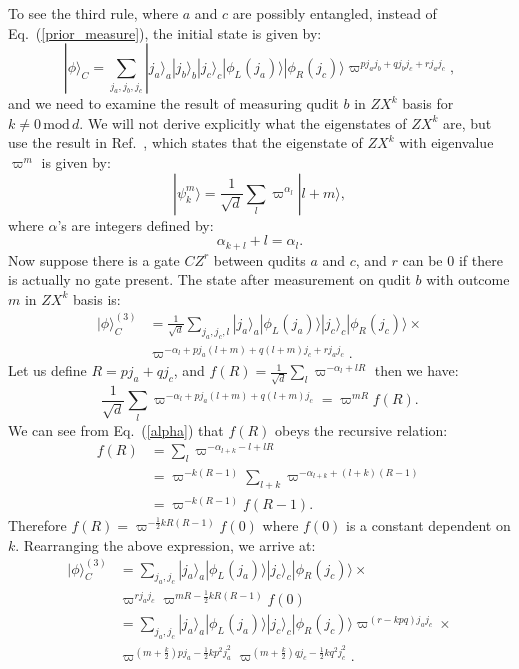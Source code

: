 \documentclass[aps,amsfonts,pra,twocolumn,showpacs]{revtex4-1}
\newcommand{\be}{\begin{equation}}
\newcommand{\ee}{\end{equation}}
\begin{document}
	To see the third rule, where $a$ and $c$ are possibly entangled, instead of Eq.~(\ref{prior_measure}), the initial state is given by:
		\be
		|\phi\rangle_C = \sum_{j_a, j_b, j_c} |j_a\rangle_a |j_b\rangle_b |j_c\rangle_c |\phi_L(j_a)\rangle |\phi_R(j_c)\rangle \varpi^{pj_aj_b+qj_bj_c+rj_aj_c},
		\ee
	and we need to  examine the result of measuring qudit $b$ in $ZX^k$ basis for $k\neq0 \, \mathrm{mod} \, d$. We will not derive explicitly what the eigenstates of $ZX^k$ are, but use the result in Ref.~\cite{Hall2006}, which states that the eigenstate of $ZX^k$ with eigenvalue $\varpi^m$ is given by:
		\be
		|\psi_k^m\rangle = \frac{1}{\sqrt{d}} \sum_l \varpi^{\alpha_l} |l+m\rangle,
		\ee
where $\alpha$'s are integers defined by:
		\be
		\alpha_{k+l}+l=\alpha_l.
		\label{alpha}
		\ee
	Now suppose there is a gate $CZ^r$ between qudits $a$ and $c$, and $r$ can be 0 if there is actually no gate present. The state after measurement on qudit $b$ with outcome $m$ in $ZX^k$ basis is:
		\begin{align}
		|\phi\rangle_C^{(3)} & = \frac{1}{\sqrt{d}} \sum_{j_a, j_c, l} |j_a\rangle_a| \phi_L(j_a)\rangle |j_c\rangle_c|\phi_R(j_c)\rangle \times \nonumber \\
			& \varpi^{-\alpha_l+pj_a(l+m)+q(l+m)j_c+rj_aj_c}.
		\end{align}
	Let us define $R=pj_a+qj_c$, and $f(R)=\frac{1}{\sqrt{d}} \sum_{l} \varpi^{-\alpha_l+lR}$ then we have:
		\be
		\frac{1}{\sqrt{d}} \sum_l \varpi^{-\alpha_l+pj_a(l+m)+q(l+m)j_c} = \varpi^{mR} f(R).
		\ee
	We can see from Eq.~(\ref{alpha}) that $f(R)$ obeys the recursive relation:
		\begin{align}
		f(R) & = \sum_{l} \varpi^{-\alpha_{l+k}-l+lR} \nonumber \nonumber \\
			& = \varpi^{-k(R-1)} \sum_{l+k} \varpi^{-\alpha_{l+k}+(l+k)(R-1)} \nonumber \\
			& = \varpi^{-k(R-1)} f(R-1).
		\end{align}
	Therefore $f(R)=\varpi^{-\frac{1}{2}kR(R-1)}f(0)$ where $f(0)$ is a constant dependent on $k$. Rearranging the above expression, we arrive at:
		\begin{align}
		|\phi\rangle_C^{(3)} & = \sum_{j_a, j_c} |j_a\rangle_a| \phi_L(j_a)\rangle |j_c\rangle_c|\phi_R(j_c)\rangle \times \nonumber \\
			& \varpi^{rj_aj_c} \varpi^{mR-\frac{1}{2}kR(R-1)}f(0) \nonumber \\
			& = \sum_{j_a, j_c} |j_a\rangle_a| \phi_L(j_a)\rangle |j_c\rangle_c|\phi_R(j_c)\rangle \varpi^{(r-kpq)j_aj_c} \times \nonumber \\
			& \varpi^{(m+\frac{k}{2})pj_a-\frac{1}{2}kp^2j_a^2} \varpi^{(m+\frac{k}{2})qj_c-\frac{1}{2}kq^2j_c^2}.
		\end{align}
\end{document}

